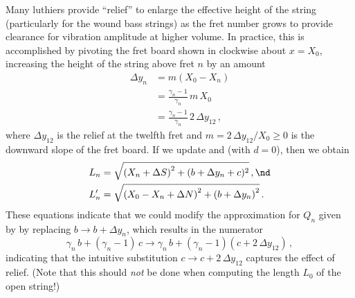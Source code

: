 
Many luthiers provide ``relief'' to enlarge the effective height of the string (particularly for the wound bass strings) as the fret number grows to provide clearance for vibration amplitude at higher volume. In practice, this is accomplished by pivoting the fret board shown in  clockwise about $x = X_0$, increasing the height of the string above fret $n$ by an amount
\begin{equation}
  \begin{split}
    \Delta y_n &= m \left(X_0 - X_n\right) \\
    &= \frac{\gamma_n - 1}{\gamma_n}\, m\, X_0 \\
    &= \frac{\gamma_n - 1}{\gamma_n}\, 2\, \Delta y_{12}\, ,
  \end{split}
\end{equation}
where $\Delta y_{12}$ is the relief at the twelfth fret and $m = 2\, \Delta y_{12} / X_0 \ge 0$ is the downward slope of the fret board. If we update  and  (with $d = 0$), then we obtain
\begin{subequations}
  \begin{align}
    L_n &= \sqrt{\left(X_n + \Delta S\right)^2 + (b + \Delta y_n + c)^2}\, , \nd \\
    L^\prime_n &= \sqrt{\left(X_0 - X_n + \Delta N\right)^2 + \left(b + \Delta y_n\right)^2}\, .
  \end{align}
\end{subequations}
These equations indicate that we could modify the approximation for $Q_n$ given by  by replacing $b \longrightarrow b + \Delta y_n$, which results in the numerator
\begin{equation}
  \gamma_n\, b + (\gamma_n - 1)\, c \longrightarrow \gamma_n\, b + (\gamma_n - 1) \left(c + 2\, \Delta y_{12}\right)\, ,
\end{equation}
indicating that the intuitive substitution $c \longrightarrow c + 2\, \Delta y_{12}$ captures the effect of relief. (Note that this should \emph{not} be done when computing the length $L_0$ of the open string!)

